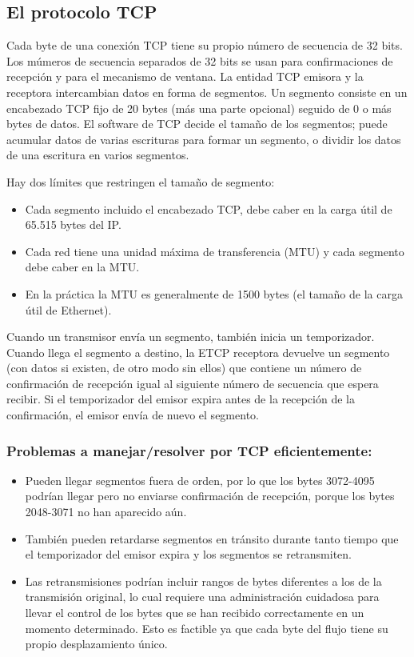 \documentclass[10pt,a4paper]{report}
\begin{document}
\subsection{El protocolo TCP}
\par Cada byte de una conexión TCP tiene su propio número de secuencia de 32 bits. 
Los múmeros de secuencia separados de 32 bits se usan para confirmaciones de 
recepción y para el mecanismo de ventana. La entidad TCP emisora y la receptora 
intercambian datos en forma de segmentos. Un segmento consiste en un encabezado 
TCP fijo de 20 bytes (más una parte opcional) seguido de 0 o más bytes de datos. El 
software de TCP decide el tamaño de los segmentos; puede acumular datos de varias 
escrituras para formar un segmento, o dividir los datos de una escritura en varios 
segmentos.
\par Hay dos límites que restringen el tamaño de segmento:
	\begin{itemize}
		\item Cada segmento incluido el encabezado TCP, debe caber en la carga útil de 
		65.515 bytes del IP.
		\item Cada red tiene una unidad máxima de transferencia (MTU) y cada segmento 
		debe caber en la MTU.
		\item En la práctica la MTU es generalmente de 1500 bytes (el tamaño de la 
		carga útil de Ethernet).
	\end{itemize}	 
\par Cuando un transmisor envía un segmento, también inicia un temporizador. Cuando 
llega el segmento a destino, la ETCP receptora devuelve un segmento (con datos si 
existen, de otro modo sin ellos) que contiene un número de confirmación de recepción 
igual al siguiente número de secuencia que espera recibir. Si el temporizador del emisor 
expira antes de la recepción de la confirmación, el emisor envía de nuevo el segmento.

\subsubsection{Problemas a manejar/resolver por TCP eficientemente:}
\begin{itemize}
	\item Pueden llegar segmentos fuera de orden, por lo que los bytes 3072-4095 
	podrían llegar pero no enviarse confirmación de recepción, porque los bytes 
	2048-3071 no han aparecido aún.
	\item También pueden retardarse segmentos en tránsito durante tanto tiempo que 
	el temporizador del emisor expira y los segmentos se retransmiten.
	\item Las retransmisiones podrían incluir rangos de bytes diferentes a los de la 
	transmisión original, lo cual requiere una administración cuidadosa para llevar el 
	control de los bytes que se han recibido correctamente en un momento 
	determinado. Esto es factible ya que cada byte del flujo tiene su propio
	desplazamiento único.
\end{itemize}
\end{document}
